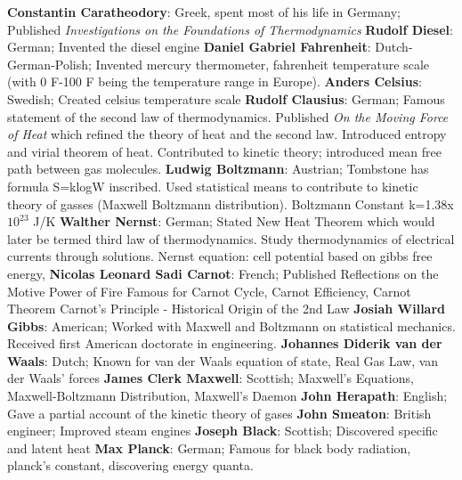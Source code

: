\documentclass{article}
\begin{document}
\begin{multicols*}{3}{}
\textbf{Constantin Caratheodory}:
Greek, spent most of his life in Germany;
Published \emph{Investigations on the Foundations of Thermodynamics}
\textbf{Rudolf Diesel}:
German;
Invented the diesel engine
\textbf{Daniel Gabriel Fahrenheit}:
Dutch-German-Polish;
Invented mercury thermometer, fahrenheit temperature scale (with 0 F-100 F being the temperature range in Europe).
\textbf{Anders Celsius}:
Swedish;
Created celsius temperature scale
\textbf{Rudolf Clausius}:
German;
Famous statement of the second law of thermodynamics. Published \emph{On the Moving Force of Heat} which refined the theory of heat and the second law. Introduced entropy and virial theorem of heat. Contributed to kinetic theory; introduced mean free path between gas molecules.
\textbf{Ludwig Boltzmann}:
Austrian;
Tombstone has formula S=klogW inscribed. Used statistical means to contribute to kinetic theory of gasses (Maxwell Boltzmann distribution). 
Boltzmann Constant k=1.38x$10^{23}$ J/K
\textbf{Walther Nernst}:
German;
Stated New Heat Theorem which would later be termed third law of thermodynamics. Study thermodynamics of electrical currents through solutions. Nernst equation: cell potential based on gibbs free energy,
\textbf{Nicolas Leonard Sadi Carnot}:
French;
Published Reflections on the Motive Power of Fire
Famous for Carnot Cycle, Carnot Efficiency, Carnot Theorem
Carnot's Principle - Historical Origin of the 2nd Law
\textbf{Josiah Willard Gibbs}:
American;
Worked with Maxwell and Boltzmann on statistical mechanics. Received first American doctorate in engineering. 
\textbf{Johannes Diderik van der Waals}:
Dutch;
Known for van der Waals equation of state, Real Gas Law, van der Waals' forces
\textbf{James Clerk Maxwell}:
Scottish;
Maxwell's Equations, Maxwell-Boltzmann Distribution, Maxwell's Daemon
\textbf{John Herapath}:
English;
Gave a partial account of the kinetic theory of gases
\textbf{John Smeaton}:
British engineer; 
Improved steam engines
\textbf{Joseph Black}:
Scottish;
Discovered specific and latent heat
\textbf{Max Planck}:
German;
Famous for black body radiation, planck's constant, discovering energy quanta.


\end{multicols*}
\end{document}
